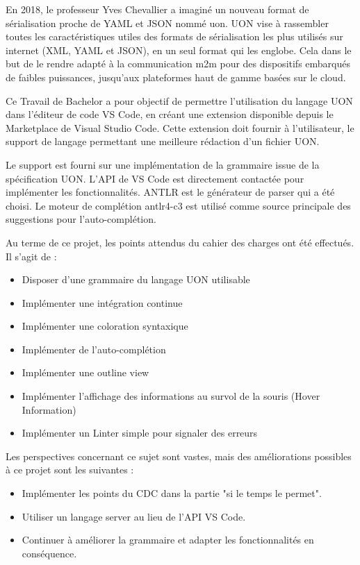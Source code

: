 
En 2018, le professeur Yves Chevallier a imaginé un nouveau format de sérialisation proche de YAML et JSON nommé \Gls{uon}.
UON vise à rassembler toutes les caractéristiques utiles des formats de sérialisation les plus utilisés sur internet (XML, YAML et JSON),
en un seul format qui les englobe. Cela dans le but de le rendre adapté à la communication \Gls{m2m} pour des dispositifs embarqués de faibles puissances, jusqu'aux plateformes haut de gamme basées sur le cloud.

Ce Travail de Bachelor a pour objectif de permettre l'utilisation du langage UON dans l'éditeur de code VS Code, en créant une extension disponible depuis le Marketplace de Visual Studio Code.
Cette extension doit fournir à l'utilisateur, le support de langage permettant une meilleure rédaction d'un fichier UON.

Le support est fourni sur une implémentation de la grammaire issue de la spécification UON.
L'API de VS Code est directement contactée pour implémenter les fonctionnalités.
ANTLR est le générateur de parser qui a été choisi.
Le moteur de complétion antlr4-c3 est utilisé comme source principale des suggestions pour l'auto-complétion.

Au terme de ce projet, les points attendus du cahier des charges ont été effectués. Il s'agit de :
\begin{itemize}
    \item Disposer d'une grammaire du langage UON utilisable
    \item Implémenter une intégration continue
    \item Implémenter une coloration syntaxique
    \item Implémenter de l'auto-complétion
    \item Implémenter une outline view
    \item Implémenter l'affichage des informations au survol de la souris (Hover Information)
    \item Implémenter un Linter simple pour signaler des erreurs
\end{itemize}

\vspace{\parskip}

Les perspectives concernant ce sujet sont vastes, mais des améliorations possibles à ce projet sont les suivantes :
\begin{itemize}
    \item Implémenter les points du CDC dans la partie "si le temps le permet".
    \item Utiliser un langage server au lieu de l'API VS Code.
    \item Continuer à améliorer la grammaire et adapter les fonctionnalités en conséquence.
\end{itemize}
